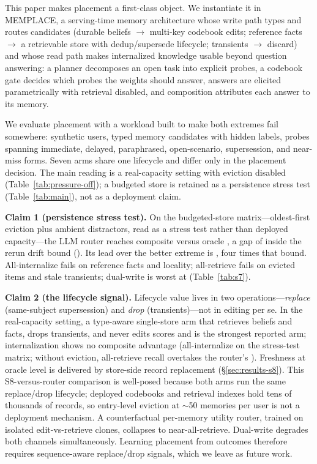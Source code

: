 \documentclass{article}
\begin{document}
This paper makes placement a first-class object. We instantiate it in MEMPLACE, a serving-time memory architecture whose write path types and routes candidates (durable beliefs $\to$ multi-key codebook edits; reference facts $\to$ a retrievable store with dedup/supersede lifecycle; transients $\to$ discard) and whose read path makes internalized knowledge usable beyond question answering: a planner decomposes an open task into explicit probes, a codebook gate decides which probes the weights should answer, answers are elicited parametrically with retrieval disabled, and composition attributes each answer to its memory.

We evaluate placement with a workload built to make both extremes fail somewhere: \TestUsers{} synthetic users, \TestMemories{} typed memory candidates with hidden labels, \TestProbes{} probes spanning immediate, delayed, paraphrased, open-scenario, supersession, and near-miss forms. Seven arms share one lifecycle and differ only in the placement decision. The main reading is a real-capacity setting with eviction disabled (Table~\ref{tab:pressure-off}); a budgeted store is retained as a persistence stress test (Table~\ref{tab:main}), not as a deployment claim.

\textbf{Claim 1 (persistence stress test).} On the budgeted-store matrix---oldest-first eviction plus ambient distractors, read as a stress test rather than deployed capacity---the LLM router reaches \SfiveComp{} composite versus oracle \SfourComp{}, a gap of \GapOracleRouter{} inside the rerun drift bound (\DriftBound). Its lead over the better extreme is \LeadExtremes, four times that bound. All-internalize fails on reference facts and locality; all-retrieve fails on evicted items and stale transients; dual-write is worst at \SsevenComp{} (Table~\ref{tab:s7}).

\textbf{Claim 2 (the lifecycle signal).} Lifecycle value lives in two operations---\emph{replace} (same-subject supersession) and \emph{drop} (transients)---not in editing per se. In the real-capacity setting, a type-aware single-store arm that retrieves beliefs and facts, drops transients, and never edits scores \SeightOffComp{} and is the strongest reported arm; internalization shows no composite advantage (all-internalize \StwoComp{} on the stress-test matrix; without eviction, all-retrieve recall \SoneOffRecall{} overtakes the router's \SfiveOffRecall). Freshness at oracle level is delivered by store-side record replacement (\S\ref{sec:results-s8}). This S8-versus-router comparison is well-posed because both arms run the same replace/drop lifecycle; deployed codebooks and retrieval indexes hold tens of thousands of records, so entry-level eviction at $\sim$50 memories per user is not a deployment mechanism. A counterfactual per-memory utility router, trained on isolated edit-vs-retrieve clones, collapses to near-all-retrieve. Dual-write degrades both channels simultaneously. Learning placement from outcomes therefore requires sequence-aware replace/drop signals, which we leave as future work.
\end{document}

